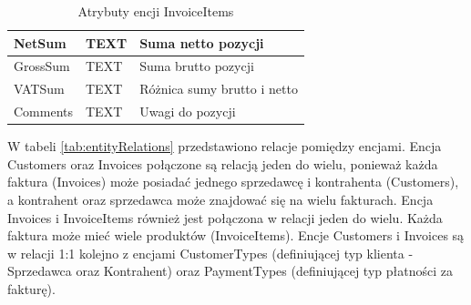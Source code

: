 \begin{table}[ht!]
{\begin{tabular}{|l|l|l|}
NetSum           & TEXT                                                              & Suma netto pozycji                                                                               \\ \hline
GrossSum         & TEXT                                                              & Suma brutto pozycji                                                                              \\ \hline
VATSum           & TEXT                                                              & Różnica sumy brutto i netto                                                                      \\ \hline
Comments         & TEXT                                                              & Uwagi do pozycji                                                                                 \\ \hline
\end{tabular}%
}
\caption{Atrybuty encji InvoiceItems}
\label{tab:InvoiceItemsAttr}
\end{table}

\newpage
W tabeli \ref{tab:entityRelations} przedstawiono relacje pomiędzy encjami. Encja Customers oraz Invoices połączone są relacją jeden do wielu, ponieważ każda faktura (Invoices) może posiadać jednego sprzedawcę i kontrahenta (Customers), a kontrahent oraz sprzedawca może znajdować się na wielu fakturach. Encja Invoices i InvoiceItems również jest połączona w relacji jeden do wielu. Każda faktura może mieć wiele produktów (InvoiceItems). Encje Customers i Invoices są w relacji 1:1 kolejno z encjami CustomerTypes (definiującej typ klienta - Sprzedawca oraz Kontrahent) oraz PaymentTypes (definiującej typ płatności za fakturę).

\begin{table}[ht!]
\centering
{}
\caption{Relacje między encjami}
\label{tab:entityRelations}
\end{table}

